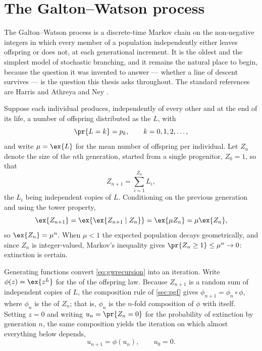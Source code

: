 \section{The Galton--Watson process}
\label{sec:gw}

The Galton--Watson process is a discrete-time Markov chain on the non-negative
integers in which every member of a population independently either leaves
offspring or does not, at each generational increment. It is the oldest and the
simplest model of stochastic branching, and it remains the natural place to begin,
because the question it was invented to answer --- whether a line of descent
survives --- is the question this thesis asks throughout. The standard references
are Harris \cite{Harris1963} and Athreya and Ney \cite{Athreya1972}.

Suppose each individual produces, independently of every other and at the end of
its life, a number of offspring distributed as the \rv{} $L$, with
\begin{equation*}
\pr{L = k} = p_k,\qquad k=0,1,2,\dots,
\end{equation*}
and write $\mu = \ex{L}$ for the mean number of offspring per individual. Let
$Z_n$ denote the size of the $n$th generation, started from a single progenitor,
$Z_0 = 1$, so that
\begin{equation}
\label{eq:gwrecursion}
Z_{n+1} = \sum_{i=1}^{Z_n}L_i ,
\end{equation}
the $L_i$ being independent copies of $L$. Conditioning on the previous generation
and using the tower property,
\begin{equation*}
\ex{Z_{n+1}} = \ex{\ex{Z_{n+1}\mid Z_n}} = \ex{\mu Z_n} = \mu\ex{Z_n},
\end{equation*}
so $\ex{Z_n} = \mu^n$. When $\mu<1$ the expected population decays geometrically,
and since $Z_n$ is integer-valued, Markov's inequality gives
$\pr{Z_n\ge1}\le\mu^n\to0$: extinction is certain.

Generating functions convert \cref{eq:gwrecursion} into an iteration. Write
$\phi(z) = \ex{z^{L}}$ for the \pgf{} of the offspring law. Because $Z_{n+1}$ is a
random sum of independent copies of $L$, the composition rule of \cref{sec:pgf}
gives $\phi_{n+1} = \phi_n\circ\phi$, where $\phi_n$ is the \pgf{} of $Z_n$; that
is, $\phi_n$ is the $n$-fold composition of $\phi$ with itself. Setting $z=0$ and
writing $u_n = \pr{Z_n=0}$ for the probability of extinction by generation $n$, the
same composition yields the iteration on which almost everything below depends,
\begin{equation}
\label{eq:iterPGF}
u_{n+1} = \phi(u_n),\qquad u_0 = 0 .
\end{equation}

